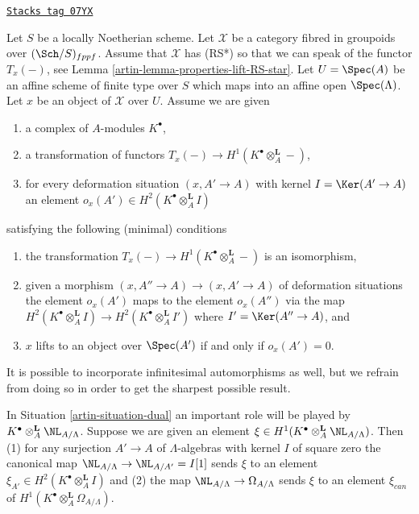 \begin{definition}
\label{artin-situation-dual}
\href{https://stacks.math.columbia.edu/tag/07YX}{\texttt{Stacks tag 07YX}}

Let $S$ be a locally Noetherian scheme. Let $\mathcal{X}$ be a category
fibred in groupoids over $(\Sch/S)_{fppf}$. Assume that
$\mathcal{X}$ has (RS*) so that we can speak of the functor $T_x(-)$, see
Lemma \ref{artin-lemma-properties-lift-RS-star}.
Let $U = \Spec(A)$ be an affine scheme of finite type over $S$ which maps
into an affine open $\Spec(\Lambda)$. Let $x$ be an object of $\mathcal{X}$
over $U$. Assume we are given
\begin{enumerate}
\item a complex of $A$-modules $K^\bullet$,
\item a transformation of functors
$T_x(-) \to H^1(K^\bullet \otimes_A^\mathbf{L} -)$,
\item for every deformation situation $(x, A' \to A)$ with kernel
$I = \Ker(A' \to A)$ an element
$o_x(A') \in H^2(K^\bullet \otimes_A^\mathbf{L} I)$
\end{enumerate}
satisfying the following (minimal) conditions
\begin{enumerate}
\item[(i)] the transformation
$T_x(-) \to H^1(K^\bullet \otimes_A^\mathbf{L} -)$
is an isomorphism,
\item[(ii)] given a morphism $(x, A'' \to A) \to (x, A' \to A)$ of deformation
situations the element $o_x(A')$ maps to the element $o_x(A'')$
via the map
$H^2(K^\bullet \otimes_A^\mathbf{L} I) \to
H^2(K^\bullet \otimes_A^\mathbf{L} I')$
where $I' = \Ker(A'' \to A)$, and
\item[(iii)] $x$ lifts to an object over $\Spec(A')$ if and only if
$o_x(A') = 0$.
\end{enumerate}
It is possible to incorporate infinitesimal automorphisms as well, but
we refrain from doing so in order to get the sharpest possible result.
\end{definition}

In Situation \ref{artin-situation-dual} an important role will be played by
$K^\bullet \otimes_A^\mathbf{L} \NL_{A/\Lambda}$. Suppose we are given an
element $\xi \in H^1(K^\bullet \otimes_A^\mathbf{L} \NL_{A/\Lambda})$.
Then (1) for any surjection $A' \to A$ of $\Lambda$-algebras with kernel
$I$ of square zero the canonical map $\NL_{A/\Lambda} \to \NL_{A/A'} = I[1]$
sends $\xi$ to an element $\xi_{A'} \in H^2(K^\bullet \otimes_A^\mathbf{L} I)$
and (2) the map $\NL_{A/\Lambda} \to \Omega_{A/\Lambda}$ sends
$\xi$ to an element $\xi_{can}$ of
$H^1(K^\bullet \otimes_A^\mathbf{L} \Omega_{A/\Lambda})$.

